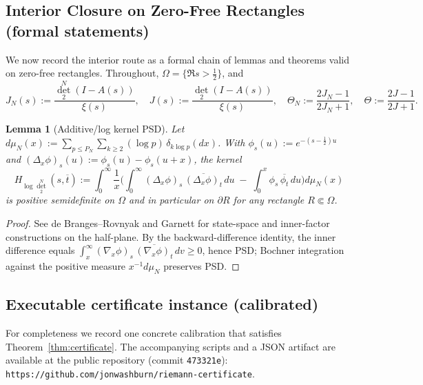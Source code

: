 \documentclass[11pt]{article}
\newtheorem{lemma}[theorem]{Lemma}
\theoremstyle{definition}
\theoremstyle{remark}
\begin{document}
\subsection*{Interior Closure on Zero-Free Rectangles (formal statements)}
We now record the interior route as a formal chain of lemmas and theorems valid on zero-free rectangles. Throughout, \(\Omega=\{\Re s>\tfrac12\}\), and
\[J_N(s):=\frac{\det_2^N(I-A(s))}{\xi(s)},\quad J(s):=\frac{\det_2(I-A(s))}{\xi(s)},\quad \Theta_N:=\frac{2J_N-1}{2J_N+1},\quad \Theta:=\frac{2J-1}{2J+1}.
\]

\begin{lemma}[Additive/log kernel PSD]\label{lem:log-psd-formal}
Let \(d\mu_N(x):=\sum_{p\le P_N}\sum_{k\ge2}(\log p)\,\delta_{k\log p}(dx)\). With \(\phi_s(u):=e^{-(s-\frac12)u}\) and \((\Delta_x\phi)_s(u):=\phi_s(u)-\phi_s(u+x)\), the kernel
\[H_{\log\det_2^N}(s,\overline t):=\int_0^\infty \frac{1}{x}\Big(\int_0^\infty (\Delta_x\phi)_s\,\overline{(\Delta_x\phi)_t}\,du\; -\; \int_0^x \phi_s\,\overline{\phi_t}\,du\Big)d\mu_N(x)
\]
is positive semidefinite on \(\Omega\) and in particular on \(\partial R\) for any rectangle \(R\Subset\Omega\).
\end{lemma}
\begin{proof}
See de Branges--Rovnyak \cite[Ch.~I–II]{deBrangesRovnyak} and Garnett \cite[Ch.~IV]{Garnett} for state-space and inner-factor constructions on the half-plane.
By the backward-difference identity, the inner difference equals \(\int_x^\infty (\nabla_x\phi)_s\,\overline{(\nabla_x\phi)_t}\,dv\ge0\), hence PSD; Bochner integration against the positive measure \(x^{-1}d\mu_N\) preserves PSD.
\end{proof}

\subsection*{Executable certificate instance (calibrated)}
For completeness we record one concrete calibration that satisfies Theorem~\ref{thm:certificate}. The accompanying scripts and a JSON artifact are available at the public repository (commit \texttt{473321e}): \texttt{https://github.com/jonwashburn/riemann-certificate}.
\end{document}

